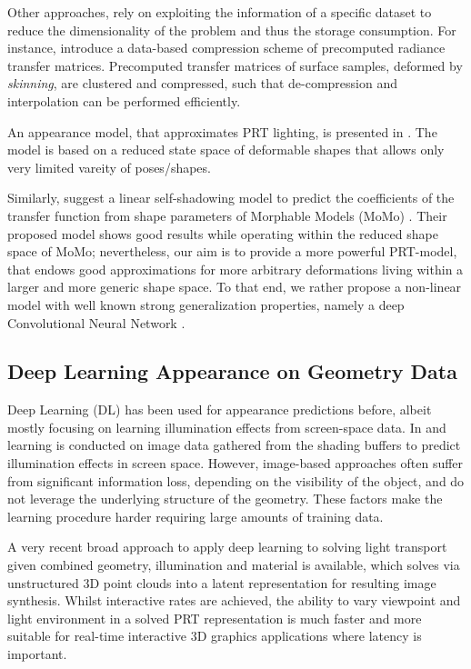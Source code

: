 Other approaches, rely on exploiting the information of a specific dataset to reduce the dimensionality of the problem and thus the storage consumption. For instance, \cite{SkinningPRT} introduce a data-based compression scheme of precomputed radiance transfer matrices. Precomputed transfer matrices of surface samples, deformed by \textit{skinning}, are clustered and compressed, such that de-compression and interpolation can be performed efficiently.

An appearance model, that approximates PRT lighting, is presented in  \cite{James_Fatahalian}. The model is based on a reduced state space of deformable shapes that allows only very limited vareity of poses/shapes. 

Similarly, \cite{MoMoPRT} suggest a linear self-shadowing model to predict the coefficients of the transfer function from shape parameters of Morphable Models (MoMo) \cite{MoMo}. Their proposed model shows good results while operating within the reduced shape space of MoMo; nevertheless, our aim is to provide a more powerful PRT-model, that endows good approximations for more arbitrary deformations living within a larger and more generic shape space. To that end, we rather propose a non-linear model with well known strong generalization properties, namely a deep Convolutional Neural Network \cite{DL_nature, ImageNet_CNN, CNN_videoClassification}. 

\subsection*{Deep Learning Appearance on Geometry Data} 
Deep Learning (DL) has been used for appearance predictions before, albeit mostly focusing on learning illumination effects from screen-space data. In  \cite{Nalbach2017b} and \cite{DBLP} learning is conducted on image data gathered from the shading buffers to predict illumination effects in screen space. However, image-based approaches often suffer from significant information loss, depending on the visibility of the object, and do not leverage the underlying structure of the geometry. These factors make the learning procedure harder requiring large amounts of training data.

A very recent broad approach to apply deep learning to solving light transport given combined geometry, illumination and material  \cite{Herm2018} is available, which solves via unstructured 3D point clouds into a latent representation for resulting image synthesis. Whilst interactive rates are achieved, the ability to vary viewpoint and light environment in a solved PRT representation is much faster and more suitable for real-time interactive 3D graphics applications where latency is important.

